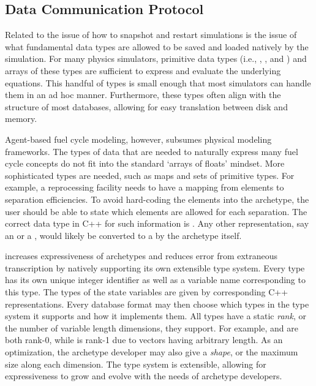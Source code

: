 \subsection{Data Communication Protocol}

Related to the issue of how to snapshot and restart simulations is the issue of
what fundamental data types are allowed to be saved and loaded natively by the
simulation. For many physics simulators, primitive data types (i.e., ,
, and ) and arrays of these types are sufficient to
express and evaluate the underlying equations. This handful of types is small enough
that most simulators can handle them in an ad hoc manner. Furthermore, these types
often align with the structure of most databases, allowing for easy translation
between disk and memory.

Agent-based fuel cycle modeling, however, subsumes physical modeling frameworks.
The types of data that are needed to naturally express many fuel cycle concepts
do not fit into the standard `arrays of floats' mindset.  More sophisticated types are needed,
such as maps and sets of primitive types. For example,
a reprocessing facility needs to have a mapping from elements to separation
efficiencies. To avoid hard-coding the elements into the archetype, the user should
be able to state which elements are allowed for each separation. The correct data
type in C++ for such information is . Any other
representation, say an  or a ,  would likely be converted to
a  by the archetype itself.

\Cyclus increases expressiveness of archetypes and reduces error from extraneous
transcription by natively supporting its own extensible type system. Every type
has its own unique integer identifier as well as
a variable name corresponding to this type.
The types of the state variables are given by corresponding C++ representations.
Every database format may then choose which types in the type system it
supports and how it implements them. All types have a static \emph{rank}, or the
number of variable length dimensions, they support.  For example,  and
 are both rank-0, while  is rank-1 due to
vectors having arbitrary length. As an optimization, the archetype developer
may also give a \emph{shape}, or the maximum size along each dimension.
The type system is extensible,
allowing for expressiveness to grow and evolve with the needs of archetype developers.

